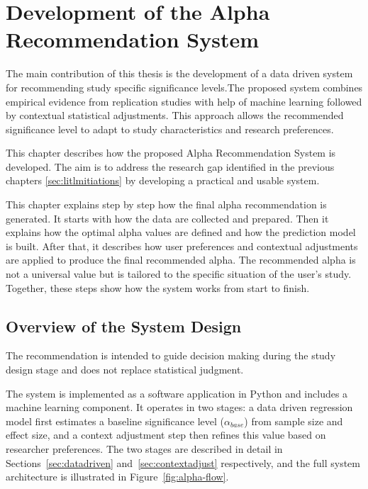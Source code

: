 
\chapter{Development of the Alpha Recommendation System}
\label{chapter:development}

The main contribution of this thesis is the development of a data driven system for recommending study specific significance levels.The proposed system combines empirical evidence from replication studies with help of machine learning followed by contextual statistical adjustments. This approach allows the recommended significance level to adapt to study characteristics and research preferences.

This chapter describes how the proposed Alpha Recommendation System is developed. The aim is to address the research gap identified in the previous chapters \ref{sec:litlmitiations} by developing a practical and usable system.

This chapter explains step by step how the final alpha recommendation is generated. It starts with how the data are collected and prepared. Then it explains how the optimal alpha values are defined and how the prediction model is built. After that, it describes how user preferences and contextual adjustments are applied to produce the final recommended alpha. The recommended alpha is not a universal value but is tailored to the specific situation of the user’s study. Together, these steps show how the system works from start to finish.

\section{Overview of the System Design}
\label{sec:overview}
  The recommendation is intended to guide decision making during the study design stage and does not replace statistical judgment.

The system is implemented as a software application in Python and 
includes a machine learning component. It operates in two stages: 
a data driven regression model first estimates a baseline significance 
level ($\alpha_{base}$) from sample size and effect size, and a context 
adjustment step then refines this value based on researcher preferences. 
The two stages are described in detail in Sections~\ref{sec:datadriven} 
and~\ref{sec:contextadjust} respectively, and the full system 
architecture is illustrated in Figure~\ref{fig:alpha-flow}.



